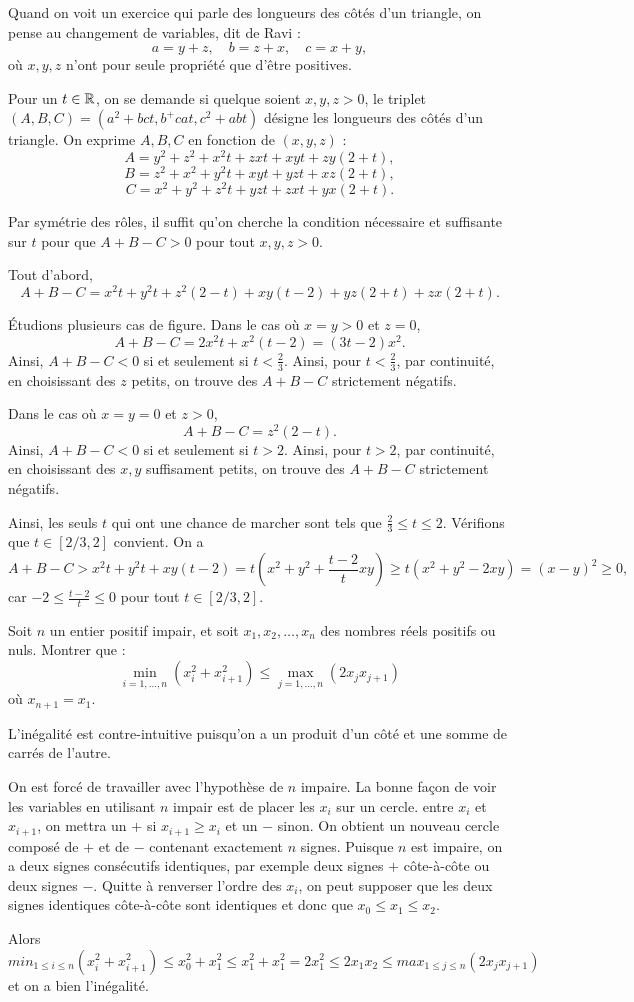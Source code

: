 \begin{sol}
Quand on voit un exercice qui parle des longueurs des côtés d'un triangle, on pense au changement de variables, dit de Ravi :
$$
a=y+z, \quad b=z+x, \quad c=x+y,
$$
où $x,y,z$ n'ont pour seule propriété que d'être positives.

Pour un $t \in \mathbb R$, on se demande si quelque soient $x,y,z > 0$, le triplet $(A,B,C)=(a^2+bct,b^+cat,c^2+abt)$ désigne les longueurs des côtés d'un triangle. On exprime $A,B,C$ en fonction de $(x,y,z)$ :
$$
A=y^2+z^2+x^2t+zxt+xyt+zy(2+t),
$$
$$
B=z^2+x^2+y^2t+xyt+yzt+xz(2+t),
$$
$$
C=x^2+y^2+z^2t+yzt+zxt+yx(2+t).
$$

Par symétrie des rôles, il suffit qu'on cherche la condition nécessaire et suffisante sur $t$ pour que $A+B-C>0$ pour tout $x,y,z>0$.

Tout d'abord,
$$
A+B-C=x^2t+y^2t+z^2(2-t)+xy(t-2)+yz(2+t)+zx(2+t).
$$

Étudions plusieurs cas de figure. Dans le cas où $x=y>0$ et $z=0$,
$$
A+B-C=2x^2t+x^2(t-2)=(3t-2)x^2.
$$
Ainsi, $A+B-C<0$ si et seulement si $t<\frac2{3}$. Ainsi, pour $t<\frac2{3}$, par continuité, en choisissant des $z$ petits, on trouve des $A+B-C$ strictement négatifs.

Dans le cas où $x=y=0$ et $z>0$,
$$
A+B-C=z^2(2-t).
$$
Ainsi, $A+B-C<0$ si et seulement si $t>2$. Ainsi, pour $t>2$, par continuité, en choisissant des $x,y$ suffisament petits, on trouve des $A+B-C$ strictement négatifs.

Ainsi, les seuls $t$ qui ont une chance de marcher sont tels que $\frac2{3} \le t \le 2$. Vérifions que $t\in[2/3,2]$ convient. On a
$$
A+B-C > x^2t+y^2t+xy(t-2) = t\left(x^2+y^2+\frac{t-2}{t}xy\right) \ge t(x^2+y^2-2xy) = (x-y)^2 \ge 0,
$$
car $-2 \le \frac{t-2}{t} \le 0$ pour tout $t\in[2/3,2]$.
\end{sol}


\begin{exo}[EGMO 2016 P1]
Soit $n$ un entier positif impair, et soit $x_1,x_2,\dots,x_n$ des nombres réels positifs ou nuls. Montrer que :
$$ \min_{i=1,\dots,n}(x_i^2+x_{i+1}^2) \le \max_{j=1,\dots,n}(2x_jx_{j+1}) $$
où $x_{n+1}=x_1$.
\end{exo}

\begin{sol}
L'inégalité est contre-intuitive puisqu'on a un produit d'un côté et une somme de carrés de l'autre.

On est forcé de travailler avec l'hypothèse de $n$ impaire. La bonne façon de voir les variables en utilisant $n$ impair est de placer les $x_i$ sur un cercle. entre $x_i$ et $x_{i+1}$, on mettra un $+$ si $x_{i+1}\ge x_i$ et un $-$ sinon. On obtient un nouveau cercle composé de $+$ et de $-$ contenant exactement $n$ signes. Puisque $n$ est impaire, on a deux signes consécutifs identiques, par exemple deux signes $+$ côte-à-côte ou deux signes $-$. Quitte à renverser l'ordre des $x_i$, on peut supposer que les deux signes identiques côte-à-côte sont identiques et donc que $x_0\le x_1\le x_2$.

Alors $$min _{1\le i\le n} (x_i^2+x_{i+1}^2)\le x_0^2+x_1^2\le x_1^2+x_1^2=2x_1^2\le 2x_1x_2\le max_{1\le j\le n}(2x_jx_{j+1})$$ et on a bien l'inégalité.
\end{sol}



